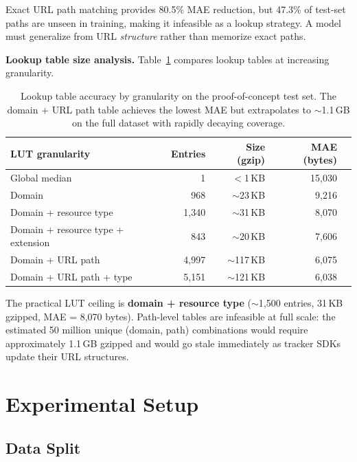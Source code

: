 \documentclass[11pt]{article}
\begin{document}
Exact URL path matching provides 80.5\% MAE reduction, but 47.3\% of test-set paths are unseen in training, making it infeasible as a lookup strategy. A model must generalize from URL \emph{structure} rather than memorize exact paths.

\textbf{Lookup table size analysis.} Table~\ref{tab:lut-analysis} compares lookup tables at increasing granularity.

\begin{table}[h]
\centering
\small
\begin{tabular}{lrrrr}
\toprule
LUT granularity & Entries & Size (gzip) & MAE (bytes) \\
\midrule
Global median & 1 & $<$1\,KB & 15,030 \\
Domain & 968 & $\sim$23\,KB & 9,216 \\
Domain + resource type & 1,340 & $\sim$31\,KB & 8,070 \\
Domain + resource type + extension & 843 & $\sim$20\,KB & 7,606 \\
Domain + URL path & 4,997 & $\sim$117\,KB & 6,075 \\
Domain + URL path + type & 5,151 & $\sim$121\,KB & 6,038 \\
\bottomrule
\end{tabular}
\caption{Lookup table accuracy by granularity on the proof-of-concept test set. The domain + URL path table achieves the lowest MAE but extrapolates to $\sim$1.1\,GB on the full dataset with rapidly decaying coverage.}
\label{tab:lut-analysis}
\end{table}

The practical LUT ceiling is \textbf{domain + resource type} ($\sim$1,500 entries, 31\,KB gzipped, MAE = 8,070 bytes). Path-level tables are infeasible at full scale: the estimated 50 million unique (domain, path) combinations would require approximately 1.1\,GB gzipped and would go stale immediately as tracker SDKs update their URL structures.

\section{Experimental Setup}
\label{sec:experiment}

\subsection{Data Split}
\end{document}
